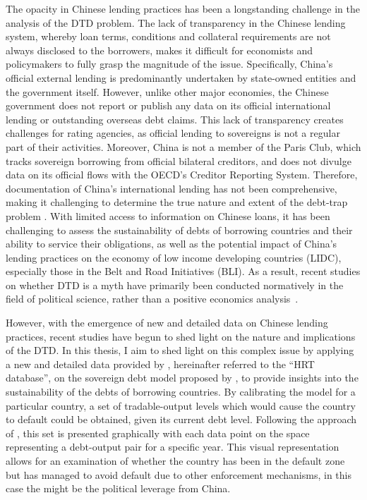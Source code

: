 The opacity in Chinese lending practices has been a longstanding challenge in the analysis of the DTD problem.
The lack of transparency in the Chinese lending system, whereby loan terms, conditions and collateral requirements are not always disclosed to the borrowers, makes it difficult for economists and policymakers to fully grasp the magnitude of the issue.
Specifically, China's official external lending is predominantly undertaken by state-owned entities and the government itself\footnotemark{}. However, unlike other major economies, the Chinese government does not report or publish any data on its official international lending or outstanding overseas debt claims. This lack of transparency creates challenges for rating agencies, as official lending to sovereigns is not a regular part of their activities. Moreover, China is not a member of the Paris Club, which tracks sovereign borrowing from official bilateral creditors, and does not divulge data on its official flows with the OECD's Creditor Reporting System. Therefore, documentation of China's international lending has not been comprehensive, making it challenging to determine the true nature and extent of the debt-trap problem \citep*{Horn-Reinhart-Trebesch-21}.
With limited access to information on Chinese loans, it has been challenging to assess the sustainability of debts of borrowing countries and their ability to service their obligations, as well as the potential impact of China's lending practices on the economy of low income developing countries (LIDC), especially those in the Belt and Road Initiatives (BLI).
As a result, recent studies on whether DTD is a myth have primarily been conducted normatively in the field of political science, rather than a positive economics analysis~\citep[See, e.g.,][]{Himmer2023-vn,Chen2020-eo}.

However, with the emergence of new and detailed data on Chinese lending practices, recent studies have begun to shed light on the nature and implications of the DTD.
In this thesis, I aim to shed light on this complex issue by applying a new and detailed data provided by \citet*{Horn-Reinhart-Trebesch-21}, hereinafter referred to the ``HRT database'', on the sovereign debt model proposed by \citet*{Na-18}, to provide insights into the sustainability of the debts of borrowing countries.
By calibrating the model for a particular country, a set of tradable-output levels which would cause the country to default could be obtained, given its current debt level. Following the approach of \citet{Hinrichsen_2020-chapter4}, this set is presented graphically with each data point on the space representing a debt-output pair for a specific year. This visual representation allows for an examination of whether the country has been in the default zone but has managed to avoid default due to other enforcement mechanisms, in this case the might be the political leverage from China.

